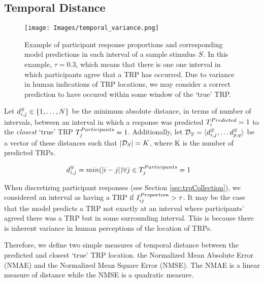 \subsection*{Temporal Distance}



\begin{figure}[htp!]
    \centering
    \texttt{[image: Images/temporal\_variance.png]}
    \caption{Example of participant response proportions and corresponding model predictions in each interval of a sample stimulus $S$. In this example, $\tau = 0.3$, which means that there is one one interval in which participants agree that a TRP has occurred. Due to variance in human indications of TRP locations, we may consider a correct prediction to have occured within some window of the `true' TRP.}
    \label{fig:exampleVectors}
\end{figure}


Let $d_{i,j}^{S} \in \{1, \ldots, N\}$ be the minimum absolute distance, in terms of number of intervals, between an interval in which a response was predicted $T_{i}^{Predicted} = 1$ to the \emph{closest} `true' TRP $T_{j}^{Participants} = 1$. Additionally, let $\mathcal{D}_{S} = \langle d_{i,j}^{S}, \ldots d_{p,q}^{S}\rangle$ be a vector of these distances such that $|\mathcal{D}_{S}| = K$, where K is the number of predicted TRPs.

\begin{align}
    d_{i,j}^{S} & = min(|i-j|) \forall j \in T_{j}^{Participants} = 1
\end{align}


When discretizing participant responses (see Section \ref{sec:trpCollection}), we considered an interval as having a TRP if $I_{ij}^{Proportion} > \tau$. It may be the case that the model predicts a TRP not exactly at an interval where participants' agreed there was a TRP but in some surrounding interval. This is because there is inherent variance in human perceptions of the location of TRPs.

Therefore, we define two simple measures of temporal distance between the predicted and closest `true' TRP location. the Normalized Mean Absolute Error (NMAE) and the Normalized Mean Square Error (NMSE). The NMAE is a linear measure of distance while the NMSE is a quadratic measure.

